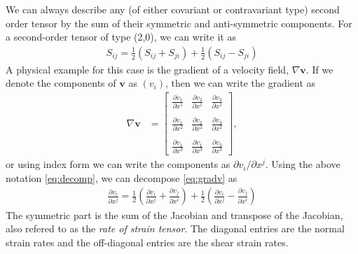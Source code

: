 \documentclass[main.tex]{subfiles}
\begin{document}
We can always describe any (of either covariant or contravariant type) second order tensor 
by the sum of their symmetric and anti-symmetric components. For a second-order tensor of type (2,0), 
we can write it as
\begin{align}\label{eq:decomp}
S_{ij} = \frac{1}{2}\left(S_{ij} + S_{ji}\right) + \frac{1}{2}\left(S_{ij} - S_{ji}\right) 
\end{align}
A physical example for this case is the gradient of a velocity field, $\nabla \mathbf{v}$. If we 
denote the components of $\mathbf{v}$ as $(v_i)$, then we can write the gradient as
\begin{align}\label{eq:gradv}
\nabla \mathbf{v} &=
\begin{bmatrix}
    \frac{\partial v_1}{\partial x^1} & \frac{\partial v_2}{\partial x^1} & \frac{\partial v_3}{\partial x^1}\\\\
    \frac{\partial v_1}{\partial x^2} & \frac{\partial v_2}{\partial x^2} & \frac{\partial v_3}{\partial x^2}\\\\
    \frac{\partial v_1}{\partial x^3} & \frac{\partial v_1}{\partial x^3} & \frac{\partial v_3}{\partial x^3}
\end{bmatrix},
\end{align}
or using index form we can write the components as $\partial v_i/\partial x^j$. Using the above 
notation \eqref{eq:decomp}, we can decompose \eqref{eq:gradv} as 
\begin{align*}
\frac{\partial v_i}{\partial x^j} = 
\frac{1}{2}\left(\frac{\partial v_i}{\partial x^j} + \frac{\partial v_j}{\partial x^i}\right) + 
\frac{1}{2}\left(\frac{\partial v_i}{\partial x^j}  - \frac{\partial v_j}{\partial x^i}\right) 
\end{align*}
The symmetric part is the sum of the Jacobian and transpose of the Jacobian, also refered to as
the \emph{rate of strain tensor}. The diagonal entries are the normal strain rates and the off-diagonal
entries are the shear strain rates.
\end{document}

